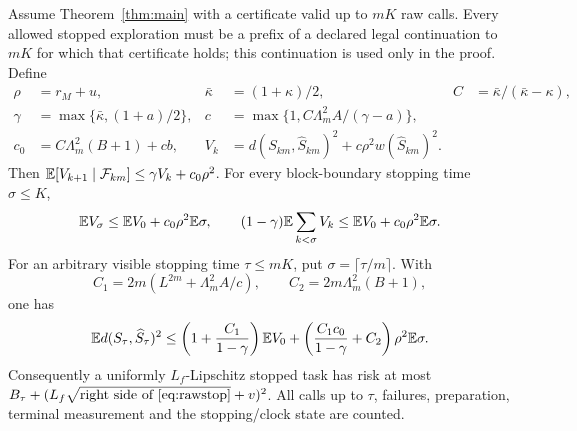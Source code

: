 \begin{theorem}\label{thm:stopping}
Assume Theorem~\ref{thm:main} with a certificate valid up to $mK$ raw calls. Every allowed stopped exploration must be a prefix of a declared legal continuation to $mK$ for which that certificate holds; this continuation is used only in the proof. Define
\begin{align*}
 \rho&=r_M+u,& \bar\kappa&=(1+\kappa)/2,&
 C&=\bar\kappa/(\bar\kappa-\kappa),\\
 \gamma&=\max\{\bar\kappa,(1+a)/2\},&
 c&=\max\{1,C\Lambda_m^2A/(\gamma-a)\},\\
 c_0&=C\Lambda_m^2(B+1)+cb,&
 V_k&=d(S_{km},\widehat S_{km})^2+c\rho^2w(\widehat S_{km})^2.
\end{align*}
Then $\mathbb E[V_{k+1}\mid\mathcal F_{km}]\le\gamma V_k+c_0\rho^2$. For every block-boundary stopping time $\sigma\le K$,
\begin{equation}\label{eq:stoppedblock}
 \mathbb E V_\sigma\le\mathbb E V_0+c_0\rho^2\mathbb E\sigma,
 \qquad
 (1-\gamma)\mathbb E\sum_{k<\sigma}V_k
 \le\mathbb E V_0+c_0\rho^2\mathbb E\sigma.
\end{equation}
For an arbitrary visible stopping time $\tau\le mK$, put $\sigma=\lceil\tau/m\rceil$. With
\[
 C_1=2m(L^{2m}+\Lambda_m^2A/c),\qquad
 C_2=2m\Lambda_m^2(B+1),
\]
one has
\begin{equation}\label{eq:rawstop}
 \mathbb E d(S_\tau,\widehat S_\tau)^2
 \le\left(1+\frac{C_1}{1-\gamma}\right)\mathbb E V_0
 +\left(\frac{C_1c_0}{1-\gamma}+C_2\right)\rho^2\mathbb E\sigma.
\end{equation}
Consequently a uniformly $L_f$-Lipschitz stopped task has risk at most $B_\tau+(L_f\sqrt{\text{right side of \eqref{eq:rawstop}}}+v)^2$. All calls up to $\tau$, failures, preparation, terminal measurement and the stopping/clock state are counted.
\end{theorem}
